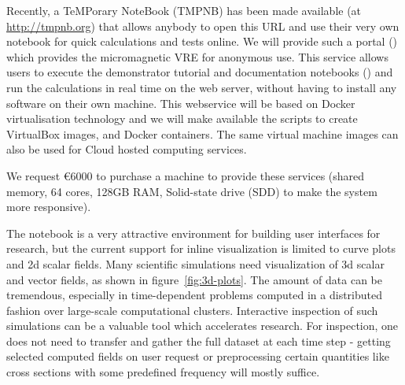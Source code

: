 \begin{workpackage}
\begin{tasklist}
\begin{task}[lead=USO,id=oommf-nb-ve,title=Online portal for
  micromagnetic VRE demonstrator,PM=3, partners={SR,JU}]
  Recently, a TeMPorary \Jupyter NoteBook (TMPNB) has been made
  available (at \href{http://tmpnb.org}{http://tmpnb.org}) that allows
  anybody to open this URL and use their very own \Jupyter notebook
  for quick calculations and tests online. We will provide such a
  portal () which provides the micromagnetic VRE for anonymous use. This
  service allows users to execute the demonstrator tutorial and
  documentation notebooks
  () and run the
  calculations in real time on the web server, without having to
  install any software on their own machine.  This webservice will be
  based on Docker \cite{Docker} virtualisation technology and we will
  make available the scripts to create VirtualBox \cite{Virtualbox}
  images, and Docker containers. The same virtual machine images can
  also be used for Cloud hosted computing services.

  We request \euro{6000} to purchase a machine to provide these
  services (shared memory, 64 cores, 128GB RAM, Solid-state drive (SDD)
  to make the system more responsive). 
\end{task}


\begin{task}[title=Visualization system for 3d data in web-notebook
, id=cfd-vis,lead=SR, partners={US,PS,USO}]

The \Jupyter notebook is a very attractive environment for building
user interfaces for research, but the current support for inline
visualization is limited to curve plots and 2d scalar fields. Many
scientific simulations need visualization of 3d scalar and vector
fields, as shown in figure~\ref{fig:3d-plots}. 
The amount of data can be tremendous, especially in
time-dependent problems computed in a distributed fashion over
large-scale computational clusters. Interactive inspection of such
simulations can be a valuable tool which accelerates research. For
inspection, one does not need to transfer and gather the full dataset
at each time step - getting selected computed fields on user request
or preprocessing certain quantities like cross sections with some
predefined frequency will mostly suffice.


\end{task}
\end{tasklist}
\end{workpackage}
